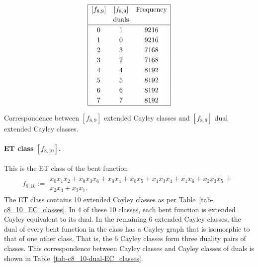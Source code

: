 \begin{table}
\small{}
\begin{align*}
\def\arraystretch{1.2}
\begin{array}{|ccc|}
\hline
[f_{8,9}] &
[f_{8,9}] &
\text{Frequency}
\\
&
\text{duals} &
\\
\hline
0 &   1 & 9216
\\
1 &   0 & 9216
\\
2 &   3 & 7168
\\
3 &   2 & 7168
\\
4 &   4 & 8192
\\
5 &   5 & 8192
\\
6 &   6 & 8192
\\
7 &   7 & 8192
\\
\hline
\end{array}
\end{align*}
\caption{Correspondence between $[f_{8,9}]$ extended Cayley classes and $[f_{8,9}]$ dual extended Cayley classes.}
\label{tab-c8_9-dual-EC_classes}
\end{table}
\newpage
\paragraph*{ET class $[f_{8,10}]$.}
%
This is the ET class of the bent function
\small{}
\begin{align*}
f_{ 8 , 10 } :=
\begin{array}{l}
x_{0} x_{1} x_{2} + x_{0} x_{3} x_{6} + x_{0} x_{4} + x_{0} x_{5} + x_{1} x_{3} x_{4} + x_{1} x_{6}
+ x_{2} x_{3} x_{5}\, +
\\
x_{2} x_{4} + x_{3} x_{7}.
\end{array}
\end{align*}
\normalsize{}
The ET class contains 10 extended Cayley classes as per
Table~\ref{tab-c8_10_EC_classes}.
In 4 of these 10 classes, each bent function is extended Cayley equivalent to its dual.
In the remaining 6 extended Cayley classes, the dual of every bent function in the class has a Cayley graph
that is isomorphic to that of one other class. That is, the 6 Cayley classes form three duality pairs of classes.
This correspondence between Cayley classes and Cayley classes of duals is shown in Table~\ref{tab-c8_10-dual-EC_classes}.

